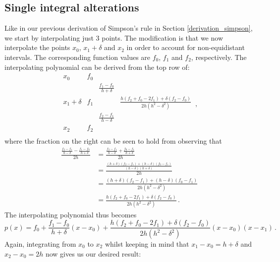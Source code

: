 \subsection{Single integral alterations}
\label{sing_alter}
Like in our previous derivation of Simpson's rule in Section \ref{derivation_simpson}, we start by interpolating just 3 points.
The modification is that we now interpolate the points $x_0$, $x_1+\delta$ and $x_2$ in order to account for non-equidistant intervals.
The corresponding function values are $f_0$, $f_1$ and $f_2$, respectively.
The interpolating polynomial can be derived from the top row of:
\begin{equation}
    \begin{matrix}
        x_0 & f_0 \\
            & & \frac{f_1-f_0}{h+\delta} \\
        x_1+\delta & f_1 & & \frac{h(f_2+f_0-2f_1)+\delta(f_2-f_0)}{2h(h^2-\delta^2)} \\
            & & \frac{f_2-f_1}{h-\delta} \\
        x_2 & f_2 & & \\
    \end{matrix} \,, \nonumber
\end{equation}
where the fraction on the right can be seen to hold from observing that
\begin{align}
    \frac{\frac{f_2-f_1}{h-\delta}-\frac{f_1-f_0}{h+\delta}}{2h} &= \frac{\frac{f_2-f_1}{h-\delta}+\frac{f_0-f_1}{h+\delta}}{2h} \nonumber\\
                                                                 &= \frac{\frac{(h+\delta)(f_2-f_1)+(h-\delta)(f_0-f_1)}{(h-\delta)(h+\delta)}}{2h} \nonumber\\
                                                                 &= \frac{(h+\delta)(f_2-f_1)+(h-\delta)(f_0-f_1)}{2h(h^2-\delta^2)} \nonumber\\
                                                                 &= \frac{h(f_2+f_0-2f_1)+\delta(f_2-f_0)}{2h(h^2-\delta^2)} \,. \nonumber
\end{align}
The interpolating polynomial thus becomes
\begin{equation}
    p(x) = f_0 + \frac{f_1-f_0}{h+\delta} (x-x_0) + \frac{h(f_2+f_0-2f_1)+\delta(f_2-f_0)}{2h(h^2-\delta^2)} (x-x_0)(x-x_1) \,.\nonumber
\end{equation}
Again, integrating from $x_0$ to $x_2$ whilst keeping in mind that $x_1-x_0 = h+\delta$ and $x_2-x_0 = 2h$ now gives us our desired result:
